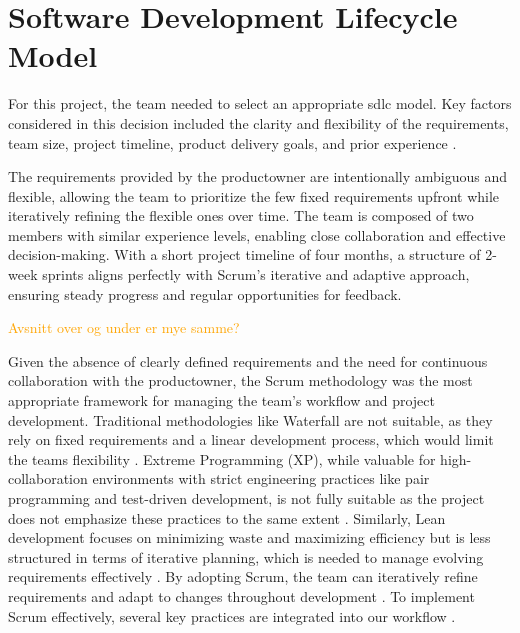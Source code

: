 \section{Software Development Lifecycle Model}

For this project, the team needed to select an appropriate \acrfull{sdlc} model. Key factors considered in this decision included the clarity and flexibility of the requirements, team size, project timeline, product delivery goals, and prior experience \cite{sdlc_model}. 

The requirements provided by the \gls{productowner} are intentionally ambiguous and flexible, allowing the team to prioritize the few fixed requirements upfront while iteratively refining the flexible ones over time. The team is composed of two members with similar experience levels, enabling close collaboration and effective decision-making. With a short project timeline of four months, a structure of 2-week sprints aligns perfectly with Scrum's iterative and adaptive approach, ensuring steady progress and regular opportunities for feedback. 

\textcolor{orange}{Avsnitt over og under er mye samme?}

Given the absence of clearly defined requirements and the need for continuous collaboration with the \gls{productowner}, the Scrum methodology was the most appropriate framework for managing the team's workflow and project development. Traditional methodologies like Waterfall are not suitable, as they rely on fixed requirements and a linear development process, which would limit the teams flexibility \cite{waterfall_model_enwiki:1275499744}. Extreme Programming (XP), while valuable for high-collaboration environments with strict engineering practices like pair programming and test-driven development, is not fully suitable as the project does not emphasize these practices to the same extent \cite{extreme_programming}. Similarly, Lean development focuses on minimizing waste and maximizing efficiency but is less structured in terms of iterative planning, which is needed to manage evolving requirements effectively \cite{lean_programming}. By adopting Scrum, the team can iteratively refine requirements and adapt to changes throughout development \cite{sdlc_model}. To implement Scrum effectively, several key practices are integrated into our workflow \cite{scrum_guide}.

